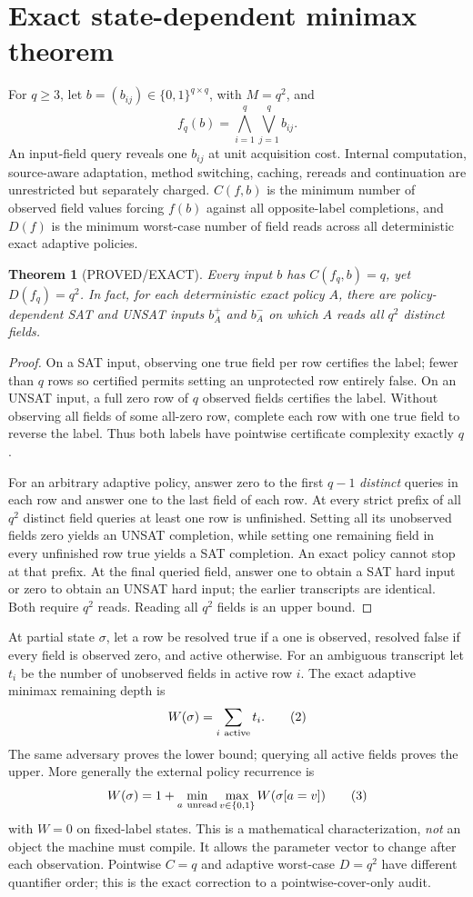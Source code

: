 \documentclass[11pt]{article}
\newtheorem{theorem}{Theorem}
\begin{document}
\section{Exact state-dependent minimax theorem}
For $q\ge3$, let $b=(b_{ij})\in\{0,1\}^{q\times q}$, with $M=q^2$, and
\[
f_q(b)=\bigwedge_{i=1}^{q}\bigvee_{j=1}^{q}b_{ij}.
\tag{1}
\]
An input-field query reveals one $b_{ij}$ at unit acquisition cost. Internal computation, source-aware adaptation, method switching, caching, rereads and continuation are unrestricted but separately charged. $C(f,b)$ is the minimum number of observed field values forcing $f(b)$ against all opposite-label completions, and $D(f)$ is the minimum worst-case number of field reads across all deterministic exact adaptive policies.

\begin{theorem}[PROVED/EXACT]\label{th:gap}
Every input $b$ has $C(f_q,b)=q$, yet $D(f_q)=q^2$. In fact, for each deterministic exact policy $A$, there are policy-dependent SAT and UNSAT inputs $b_A^+$ and $b_A^-$ on which $A$ reads all $q^2$ distinct fields.
\end{theorem}
\begin{proof}
On a SAT input, observing one true field per row certifies the label; fewer than $q$ rows so certified permits setting an unprotected row entirely false. On an UNSAT input, a full zero row of $q$ observed fields certifies the label. Without observing all fields of some all-zero row, complete each row with one true field to reverse the label. Thus both labels have pointwise certificate complexity exactly $q$.

For an arbitrary adaptive policy, answer zero to the first $q-1$ \emph{distinct} queries in each row and answer one to the last field of each row. At every strict prefix of all $q^2$ distinct field queries at least one row is unfinished. Setting all its unobserved fields zero yields an UNSAT completion, while setting one remaining field in every unfinished row true yields a SAT completion. An exact policy cannot stop at that prefix. At the final queried field, answer one to obtain a SAT hard input or zero to obtain an UNSAT hard input; the earlier transcripts are identical. Both require $q^2$ reads. Reading all $q^2$ fields is an upper bound.
\end{proof}

At partial state $\sigma$, let a row be resolved true if a one is observed, resolved false if every field is observed zero, and active otherwise. For an ambiguous transcript let $t_i$ be the number of unobserved fields in active row $i$. The exact adaptive minimax remaining depth is
\[
W(\sigma)=\sum_{i\ {\rm active}}t_i.
\tag{2}
\]
The same adversary proves the lower bound; querying all active fields proves the upper. More generally the external policy recurrence is
\[
W(\sigma)=1+\min_{a\ {\rm unread}}\max_{v\in\{0,1\}}W(\sigma[a=v])
\tag{3}
\]
with $W=0$ on fixed-label states. This is a mathematical characterization, \emph{not} an object the machine must compile. It allows the parameter vector to change after each observation. Pointwise $C=q$ and adaptive worst-case $D=q^2$ have different quantifier order; this is the exact correction to a pointwise-cover-only audit.
\end{document}
